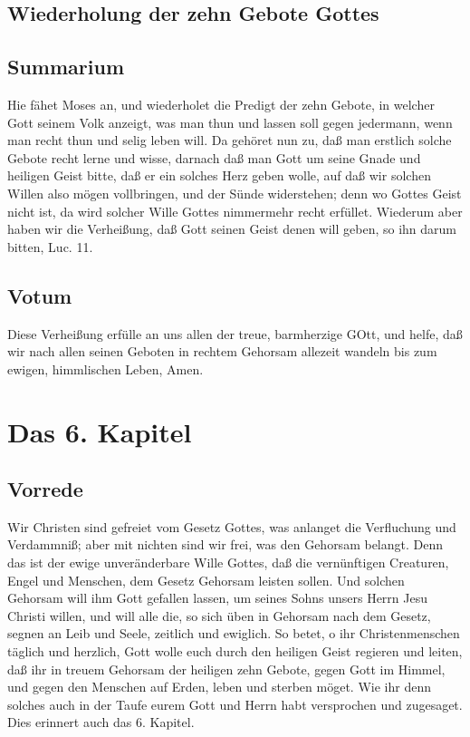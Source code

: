 \section{Wiederholung der zehn Gebote Gottes}

\section{Summarium}

Hie fähet Moses an, und wiederholet die Predigt der zehn Gebote, in welcher Gott seinem Volk anzeigt, was man thun und lassen soll gegen jedermann, wenn man recht thun und selig leben will. Da gehöret nun zu, daß man erstlich solche Gebote recht lerne und wisse, darnach daß man Gott um seine Gnade und heiligen Geist bitte, daß er ein solches Herz geben wolle, auf daß wir solchen Willen also mögen vollbringen, und der Sünde widerstehen; denn wo Gottes Geist nicht ist, da wird solcher Wille Gottes nimmermehr recht erfüllet. Wiederum aber haben wir die Verheißung, daß Gott seinen
Geist denen will geben, so ihn darum bitten, Luc. 11.

\section{Votum}

Diese Verheißung erfülle an uns allen der treue, barmherzige GOtt, und helfe, daß wir nach allen seinen Geboten in rechtem Gehorsam allezeit wandeln bis zum ewigen, himmlischen Leben, Amen.

\chapter{Das 6. Kapitel}

\section{Vorrede}

Wir Christen sind gefreiet vom Gesetz Gottes, was anlanget die Verfluchung und Verdammniß; aber mit nichten sind wir frei, was den Gehorsam belangt. Denn das ist der ewige unveränderbare Wille Gottes, daß die vernünftigen Creaturen, Engel und Menschen, dem Gesetz Gehorsam leisten sollen. Und solchen Gehorsam will ihm Gott gefallen lassen, um seines Sohns unsers Herrn Jesu Christi willen, und will alle die, so sich üben in Gehorsam nach dem Gesetz, segnen an Leib und Seele, zeitlich und ewiglich. So betet, o ihr Christenmenschen täglich und herzlich, Gott wolle euch durch den heiligen Geist regieren und leiten, daß ihr in treuem Gehorsam der heiligen zehn Gebote, gegen Gott im Himmel, und gegen den Menschen auf Erden, leben und sterben möget. Wie ihr denn solches auch in der Taufe eurem Gott und Herrn habt versprochen und zugesaget. Dies erinnert auch das 6. Kapitel.

